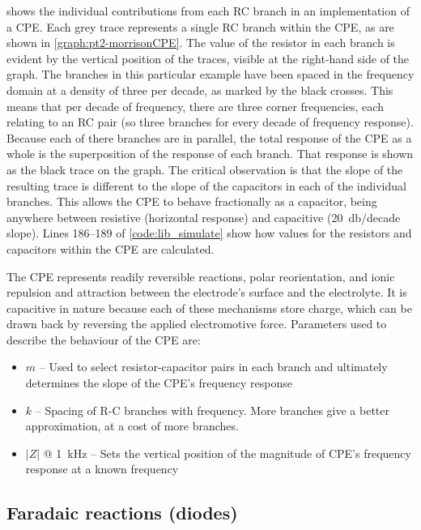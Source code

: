      shows the individual contributions from each RC branch in an implementation of a CPE.
    Each grey trace represents a single RC branch within the CPE, as are shown in \cref{graph:pt2-morrisonCPE}.
    The value of the resistor in each branch is evident by the vertical position of the traces, visible at the right-hand side of the graph.
    The branches in this particular example have been spaced in the frequency domain at a density of three per decade, as marked by the black crosses.
    This means that per decade of frequency, there are three corner frequencies, each relating to an RC pair (so three branches for every decade of frequency response).
    Because each of there branches are in parallel, the total response of the CPE as a whole is the superposition of the response of each branch.
    That response is shown as the black trace on the graph.
    The critical observation is that the slope of the resulting trace is different to the slope of the capacitors in each of the individual branches.
    This allows the CPE to behave fractionally as a capacitor, being anywhere between resistive (horizontal response) and capacitive (\SI{20}{\decibel}/decade slope).
    Lines 186--189 of \cref{code:lib_simulate} show how values for the resistors and capacitors within the CPE are calculated.

    The CPE represents readily reversible reactions, polar reorientation, and ionic repulsion and attraction between the electrode's surface and the electrolyte.
    It is capacitive in nature because each of these mechanisms store charge, which can be drawn back by reversing the applied electromotive force.
    Parameters used to describe the behaviour of the CPE are:
    \begin{itemize}
      \item $m$ -- Used to select resistor-capacitor pairs in each branch and ultimately determines the slope of the CPE's frequency response
      \item $k$ -- Spacing of R-C branches with frequency. More branches give a better approximation, at a cost of more branches.
      \item $|Z|$ @ \SI{1}{\kilo\hertz} -- Sets the vertical position of the magnitude of CPE's frequency response at a known frequency
    \end{itemize}



  \subsection{Faradaic reactions (diodes)}


